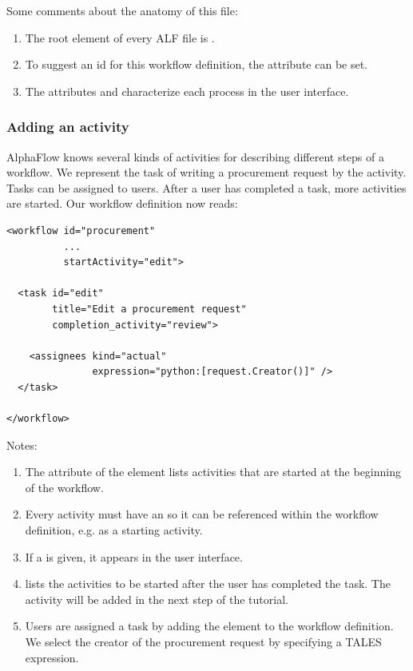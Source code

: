 Some comments about the anatomy of this file:
\begin{enumerate}
\item The root element of every ALF file is .
\item To suggest an id for this workflow definition, the  attribute
  can be set.
\item The attributes  and  characterize
  each process in the user interface.
\end{enumerate}
            
\subsubsection{Adding an activity}

AlphaFlow knows several kinds of activities for describing different steps of
a workflow. We represent the task of writing a procurement request by the
 activity. Tasks can be assigned to users. After a user has
completed a task, more activities are started. Our workflow definition now
reads:

\begin{verbatim}
<workflow id="procurement"
          ...
          startActivity="edit">

  <task id="edit"
        title="Edit a procurement request"
        completion_activity="review">

    <assignees kind="actual"
               expression="python:[request.Creator()]" />
  </task>

</workflow>
\end{verbatim}

Notes:
\begin{enumerate}
\item The attribute  of the  element
  lists activities that are started at the beginning of the workflow.
\item Every activity must have an  so it can be referenced within
  the workflow definition, e.g. as a starting activity.
\item If a  is given, it appears in the user interface.
\item {} lists the activities to be started after
  the user has completed the task. The  activity will be added
  in the next step of the tutorial.
\item Users are assigned a task by adding the  element to
  the workflow definition. We select the creator of the procurement request by
  specifying a TALES expression.
\end{enumerate}

